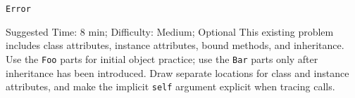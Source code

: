 \begin{parts}
\begin{blocksection}
\begin{solution}[2em]
\lstinline$Error$
\end{solution}
\end{blocksection}




\end{parts}

\begin{questionmeta}
    Suggested Time: 8 min; Difficulty: Medium; Optional
    This existing problem includes class attributes, instance attributes, bound methods, and inheritance. Use the \lstinline{Foo} parts for initial object practice; use the \lstinline{Bar} parts only after inheritance has been introduced. Draw separate locations for class and instance attributes, and make the implicit \lstinline{self} argument explicit when tracing calls.
\end{questionmeta}
